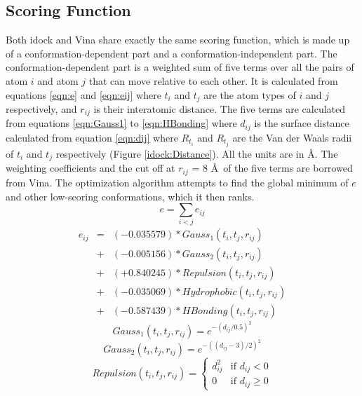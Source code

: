 \subsection{Scoring Function}

Both idock and Vina share exactly the same scoring function, which is made up of a conformation-dependent part and a conformation-independent part. The conformation-dependent part is a weighted sum of five terms over all the pairs of atom $i$ and atom $j$ that can move relative to each other. It is calculated from equations \eqref{eqn:e} and \eqref{eqn:eij} where $t_i$ and $t_j$ are the atom types of $i$ and $j$ respectively, and $r_{ij}$ is their interatomic distance. The five terms are calculated from equations \eqref{eqn:Gauss1} to \eqref{eqn:HBonding} where $d_{ij}$ is the surface distance calculated from equation \eqref{eqn:dij} where $R_{t_i}$ and $R_{t_j}$ are the Van der Waals radii of $t_i$ and $t_j$ respectively (Figure \ref{idock:Distance}). All the units are in \AA. The weighting coefficients and the cut off at $r_{ij}$ = 8 \AA\ of the five terms are borrowed from Vina. The optimization algorithm attempts to find the global minimum of $e$ and other low-scoring conformations, which it then ranks.
\begin{equation}
\label{eqn:e}
e = \sum_{i < j} e_{ij}
\end{equation}
\begin{eqnarray}
\label{eqn:eij}
e_{ij} &=& (-0.035579) * Gauss_1(t_i, t_j, r_{ij}) \nonumber \\
       &+& (-0.005156) * Gauss_2(t_i, t_j, r_{ij}) \nonumber \\
       &+& (+0.840245) * Repulsion(t_i, t_j, r_{ij}) \nonumber \\
       &+& (-0.035069) * Hydrophobic(t_i, t_j, r_{ij}) \nonumber \\
       &+& (-0.587439) * HBonding(t_i, t_j, r_{ij})
\end{eqnarray}
\begin{equation}
\label{eqn:Gauss1}
Gauss_1(t_i, t_j, r_{ij}) = e^{-(d_{ij} / 0.5)^2}
\end{equation}
\begin{equation}
\label{eqn:Gauss2}
Gauss_2(t_i, t_j, r_{ij}) = e^{-((d_{ij} - 3) / 2)^2}
\end{equation}
\begin{equation}
\label{eqn:Repulsion}
Repulsion(t_i, t_j, r_{ij}) =
\begin{cases}
d_{ij}^2 & \text{if } d_{ij} < 0\\
0 &\text{if } d_{ij} \geq 0
\end{cases}
\end{equation}
